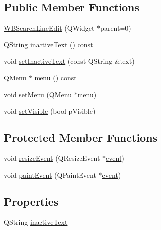 \subsection*{Public Member Functions}
\begin{DoxyCompactItemize}
\item 
\hyperlink{class_w_b_search_line_edit_a2e5341c027fc5800ad24c1beee6bc8b1}{W\-B\-Search\-Line\-Edit} (Q\-Widget $\ast$parent=0)
\item 
Q\-String \hyperlink{class_w_b_search_line_edit_a442677d367b94cbaec6dae51646cec76}{inactive\-Text} () const 
\item 
void \hyperlink{class_w_b_search_line_edit_a6a7e5818f01dfbf6c71f38f2d1f80978}{set\-Inactive\-Text} (const Q\-String \&text)
\item 
Q\-Menu $\ast$ \hyperlink{class_w_b_search_line_edit_a44e00f3dccf769084ebe0b994baab91b}{menu} () const 
\item 
void \hyperlink{class_w_b_search_line_edit_aaf7efc2fb9abf9e8a680bfccfc92316b}{set\-Menu} (Q\-Menu $\ast$\hyperlink{class_w_b_search_line_edit_a44e00f3dccf769084ebe0b994baab91b}{menu})
\item 
void \hyperlink{class_w_b_search_line_edit_abe9c3dd2ea75106d6288828bd2c4eb35}{set\-Visible} (bool p\-Visible)
\end{DoxyCompactItemize}
\subsection*{Protected Member Functions}
\begin{DoxyCompactItemize}
\item 
void \hyperlink{class_w_b_search_line_edit_a26254b38cda1c4b20e139b66e31934ee}{resize\-Event} (Q\-Resize\-Event $\ast$\hyperlink{class_w_b_ex_line_edit_ab1bce2b599c0e2602b4fbe5ad19b5a7e}{event})
\item 
void \hyperlink{class_w_b_search_line_edit_a2912b8499cade9e57fad779b084deb32}{paint\-Event} (Q\-Paint\-Event $\ast$\hyperlink{class_w_b_ex_line_edit_ab1bce2b599c0e2602b4fbe5ad19b5a7e}{event})
\end{DoxyCompactItemize}
\subsection*{Properties}
\begin{DoxyCompactItemize}
\item 
Q\-String \hyperlink{class_w_b_search_line_edit_a50a8748d17d08f45fbf6fb43b3c5f56d}{inactive\-Text}
\end{DoxyCompactItemize}
